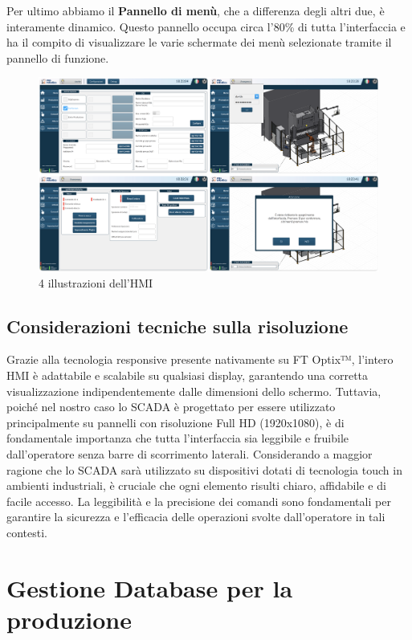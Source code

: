 Per ultimo abbiamo il \textbf{Pannello di menù}, che a differenza degli altri due, è interamente dinamico. Questo pannello occupa circa l'80\% di tutta l'interfaccia e ha il compito di visualizzare le varie schermate dei menù selezionate tramite il pannello di funzione. 

\begin{figure} [!ht]
    \centering
    \includegraphics[width=1\linewidth]{Immagini/HMI01.png}
    \caption{4 illustrazioni dell'HMI}
    \label{fig:HMI01.png}
\end{figure}

\subsection{Considerazioni tecniche sulla risoluzione}
Grazie alla tecnologia responsive presente nativamente su FT Optix™, l'intero HMI è adattabile e scalabile su qualsiasi display, garantendo una corretta visualizzazione indipendentemente dalle dimensioni dello schermo. Tuttavia, poiché nel nostro caso lo SCADA è progettato per essere utilizzato principalmente su pannelli con risoluzione Full HD (1920x1080), è di fondamentale importanza che tutta l'interfaccia sia leggibile e fruibile dall'operatore senza barre di scorrimento laterali.
Considerando a maggior ragione che lo SCADA sarà utilizzato su dispositivi dotati di tecnologia touch in ambienti industriali, è cruciale che ogni elemento risulti chiaro, affidabile e di facile accesso. La leggibilità e la precisione dei comandi sono fondamentali per garantire la sicurezza e l'efficacia delle operazioni svolte dall'operatore in tali contesti.

\section{Gestione Database per la produzione}

